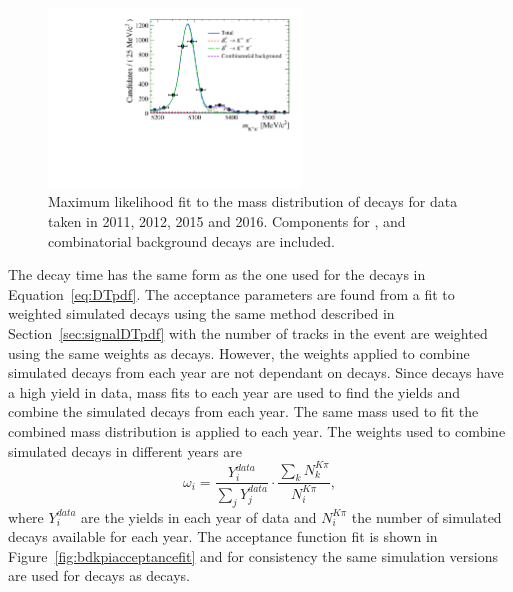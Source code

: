 \begin{figure}[tbp]
\centering
  \includegraphics[width=0.6\textwidth]{./Figs/LifetimeSystematics/Bd2KPi_mass_fit.pdf}
\caption{Maximum likelihood fit to the mass distribution of \bdkpi decays for data taken in 2011, 2012, 2015 and 2016. Components for \bdkpi, \bskpi and combinatorial background decays are included. }
\label{fig:bdkpimassfit}
\end{figure}


The decay time \pdf has the same form as the one used for the \bsmumu decays in Equation~\ref{eq:DTpdf}. The acceptance parameters are found from a fit to weighted \bdkpi simulated decays using the same method described in Section~\ref{sec:signalDTpdf} with the number of tracks in the event are weighted using the same weights as \bsmumu decays. However, the weights applied to combine simulated \bdkpi decays from each year are not dependant on \bsjpsiphi decays. Since \bdkpi decays have a high yield in data, mass fits to each year are used to find the yields and combine the simulated decays from each year. The same mass \pdf used to fit the combined mass distribution is applied to each year. The weights used to combine simulated decays in different years are
\begin{equation}
\omega_{i}  = \frac{Y_{i}^{data}}{\displaystyle\sum_{j} Y_{j}^{data}} \cdot \frac{\displaystyle\sum_{k} N_{k}^{K\pi}}{N_{i}^{K\pi}},
\end{equation}
where $Y_{i}^{data}$ are the \bdkpi yields in each year of data and $N_{i}^{K\pi}$ the number of simulated decays available for each year.
The acceptance function fit is shown in Figure~\ref{fig:bdkpiacceptancefit} and for consistency the same simulation versions are used for \bdkpi decays as \bsmumu decays. 

